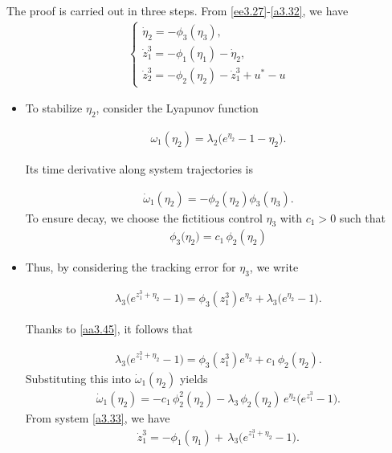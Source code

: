 \documentclass[10pt, a4paper]{amsart}
\makeatletter
\theoremstyle{plain}
\theoremstyle{definition}
\theoremstyle{remark}
\renewenvironment{proof}[1][\proofname]{\par
  \pushQED{\qed}%
  \normalfont \topsep6\p@\@plus6\p@\relax
  \trivlist
  \item[\hskip\labelsep
        \itshape
    #1\ \ref{#1}.]\ignorespaces
}{%
  \popQED\endtrivlist\@endpefalse
}
\numberwithin{equation}{section}
\makeatother
\begin{document}
\begin{proof}[of Theorem \ref{the3.3}] The proof is carried out in three steps. From \eqref{ee3.27}-\eqref{a3.32}, we have 
\begin{align}\label{a3.33}
\begin{cases}%
\dot\eta_2= -\phi_3(\eta_3),\\
   \dot z^3_1=-\phi_1(\eta_1)-\dot\eta_2,\\
   \dot z^3_2=- \phi_2(\eta_2)-\dot z^3_1+u^* - u 
\end{cases}
\end{align}
\begin{itemize}
\item[\bf Step (i)] To stabilize $\eta_{2}$, consider the Lyapunov function

 \begin{align}
     \omega_{1}(\eta_{2})=\lambda_{2}\bigl(e^{\eta_{2}}-1-\eta_{2}\bigr).
 \end{align}

Its time derivative along system trajectories is

 \begin{align}
\dot \omega_{1}(\eta_2)=-\phi_2(\eta_2)\phi_3(\eta_3).
 \end{align}
To ensure decay, we choose the fictitious control $\eta_3$ with $c_1 > 0$ such that
\begin{align}\label{aa3.45}
    \phi_3\big( \eta_2 \big) = c_1\,\phi_2(\eta_2) 
\end{align}

\item[\bf Step (ii)] Thus, by considering the tracking error for $\eta_3$, we write

 \begin{align}\label{a3.37}
     \lambda_3\big(e^{z^3_1+\eta_2} - 1\big) 
 = \phi_3(z^3_1) e^{\eta_2} + \lambda_3\big(e^{\eta_2} - 1\big).
 \end{align}

Thanks to \eqref{aa3.45}, it follows that

\begin{align}
     \lambda_3\big(e^{z^3_1+\eta_2} - 1\big) 
 = \phi_3(z^3_1) e^{\eta_2} + c_1\,\phi_2(\eta_2).
\end{align}
 Substituting this into $\dot \omega_1(\eta_2)$ yields
\begin{align}
\dot \omega_{1}(\eta_2)
 = -c_1\,\phi_2^2(\eta_2) - \lambda_3\,\phi_2(\eta_2)\,e^{\eta_2}\big(e^{z^3_1} - 1\big).
\end{align}
From system \eqref{a3.33}, we have
\begin{align}
 \dot z^3_1 = -\phi_1(\eta_1)
 + \,\lambda_3\big(e^{z^3_1+\eta_2}-1\big).
\end{align}


\end{itemize}
\end{proof}
\end{document}
